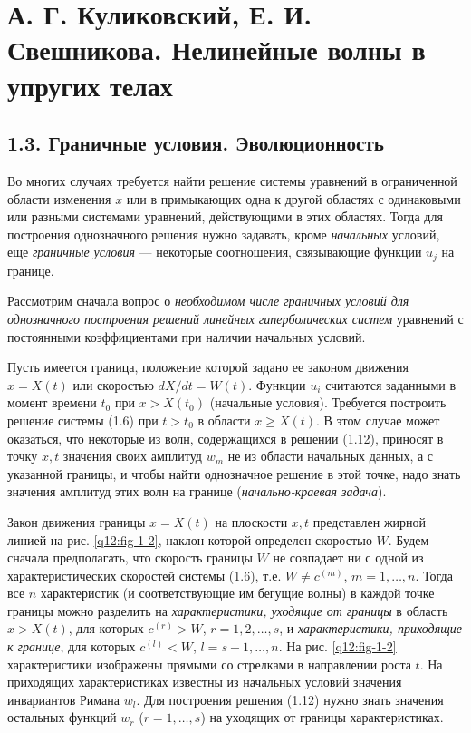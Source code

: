\section*{А. Г. Куликовский, Е. И. Свешникова. Нелинейные волны в упругих телах}
\subsection*{1.3. Граничные условия. Эволюционность}
Во многих случаях требуется найти решение системы уравнений в ограниченной области изменения $x$ или в примыкающих одна к другой областях с одинаковыми или разными системами уравнений, действующими в этих областях. Тогда для построения однозначного решения нужно задавать, кроме \textit{начальных} условий, еще \textit{граничные условия} --- некоторые соотношения, связывающие функции $u_j$ на границе.

Рассмотрим сначала вопрос о \textit{необходимом числе граничных условий для однозначного построения решений линейных гиперболических систем} уравнений с постоянными коэффициентами при наличии начальных условий.

Пусть имеется граница, положение которой задано ее законом движения $x=X(t)$ или скоростью $dX/dt=W(t)$. Функции $u_i$ считаются заданными в момент времени $t_0$ при $x>X(t_0)$ (начальные условия). Требуется построить решение системы (1.6) при $t>t_0$ в области $x\ge X(t)$. В этом случае может оказаться,
что некоторые из волн, содержащихся в решении (1.12), приносят в точку $x,t$ значения своих амплитуд $w_m$ не из области начальных данных, а с указанной границы, и чтобы найти однозначное решение в этой точке, надо знать значения амплитуд этих волн на границе (\textit{начально-краевая задача}).

Закон движения границы $x=X(t)$ на плоскости $x,t$ представлен жирной линией на рис. \ref{q12:fig-1-2}, наклон которой определен скоростью $W$. Будем сначала предполагать, что скорость границы $W$ не совпадает ни с одной из характеристических скоростей системы (1.6), т.е. $W\ne c^{(m)}$, $m=1,\ldots,n$. Тогда все $n$ характеристик (и соответствующие им бегущие волны) в каждой точке границы можно разделить на \textit{характеристики, уходящие от границы} в область $x>X(t)$, для которых $c^{(r)}>W$, $r=1,2,\ldots,s$, и \textit{характеристики, приходящие к границе}, для которых $c^{(l)}<W$, $l=s+1,\ldots,n$. На рис. \ref{q12:fig-1-2} характеристики изображены прямыми со стрелками в направлении роста $t$. На приходящих характеристиках известны из начальных условий значения инвариантов Римана $w_l$. Для построения решения (1.12) нужно знать значения остальных функций $w_r$ ($r=1,\ldots,s$) на уходящих от границы характеристиках.

